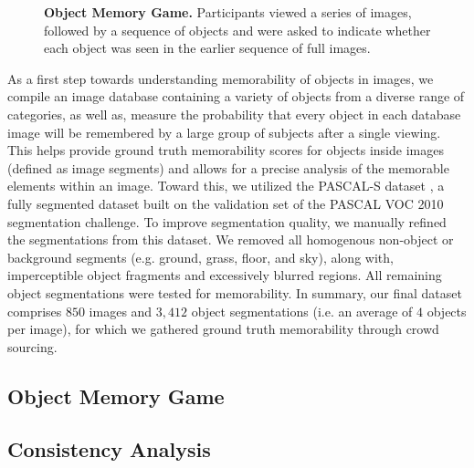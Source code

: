 \begin{figure}[!htb]
\centering
{}
\vspace{-5mm}\caption{\footnotesize\textbf{Object Memory Game.} Participants viewed a series of images, followed by a sequence of objects and were asked to indicate whether each object was seen in the earlier sequence of full images. }\label{fig:mainTask}
\end{figure}


As a first step towards understanding memorability of objects in
images, we compile an image database containing a variety of objects
from a diverse range of categories, as well as, measure the
probability that every object in each database image will be
remembered by a large group of subjects after a single viewing. 
%
This
helps provide ground truth memorability scores for objects inside
images (defined as image segments) and allows for a precise analysis
of the memorable elements within an image. 
%
Toward this, we utilized the
PASCAL-S dataset \cite{yin14}, a fully segmented dataset built on the
validation set of the PASCAL VOC 2010 \cite{pascal10} segmentation
challenge. To improve segmentation quality, we manually refined the
segmentations from this dataset. We removed all homogenous non-object
or background segments (e.g. ground, grass, floor, and sky), along
with, imperceptible object fragments and excessively blurred
regions. All remaining object segmentations were tested for
memorability. In summary, our final dataset comprises $850$ images and
$3,412$ object segmentations (i.e. an average of $4$ objects per
image), for which we gathered ground truth memorability through crowd
sourcing. %


\subsection{Object Memory Game}


\subsection{Consistency Analysis}

